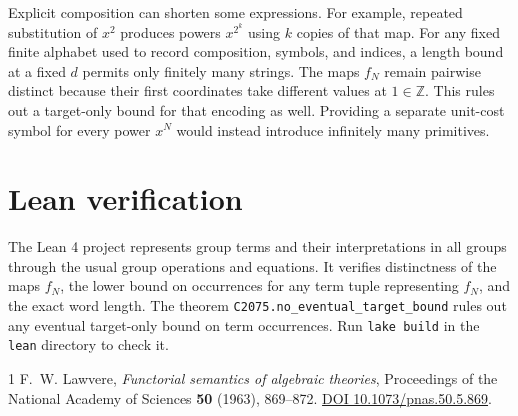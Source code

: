 \documentclass[11pt]{article}
\begin{document}
Explicit composition can shorten some expressions. For example, repeated
substitution of $x^2$ produces powers $x^{2^k}$ using $k$ copies of that
map. For any fixed finite alphabet used to record composition, symbols,
and indices, a length bound at a fixed $d$ permits only finitely many
strings. The maps $f_N$ remain pairwise distinct because their first
coordinates take different values at $1\in\mathbb Z$. This rules out a
target-only bound for that encoding as well. Providing a separate
unit-cost symbol for every power $x^N$ would instead introduce infinitely
many primitives.

\section*{Lean verification}

The Lean 4 project represents group terms and their interpretations in all
groups through the usual group operations and equations. It verifies
distinctness of the maps $f_N$, the lower bound on occurrences for any term
tuple representing $f_N$, and the exact word length. The theorem
\texttt{C2075.no\_eventual\_target\_bound} rules out any eventual target-only
bound on term occurrences. Run \texttt{lake build} in the \texttt{lean}
directory to check it.

\begin{thebibliography}{1}
F.~W. Lawvere, \emph{Functorial semantics of algebraic theories},
Proceedings of the National Academy of Sciences \textbf{50} (1963), 869--872.
\href{https://doi.org/10.1073/pnas.50.5.869}{DOI 10.1073/pnas.50.5.869}.
\end{thebibliography}
\end{document}
